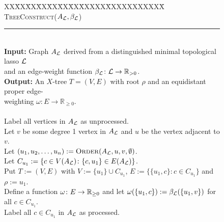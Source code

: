\begin{figure}
\centering
\parbox{0cm}{\begin{tabbing}
XX\= XX\= XX\=  XX\= XX\= XX\= XX\=  XXXXX\=  XXXXXXXXXXX\= \kill \\
{\textsc{TreeConstruct}($A_{{\mathcal L}},\beta_{{\mathcal L}}$)} \\
\rule{\columnwidth}{0.5pt}\\
\textbf{Input:} \> \> \> Graph $A_{{\mathcal L}}$ derived from a distinguished minimal topological lasso ${\mathcal L}$\\
                \> \> \> and an edge-weight function $\beta_{{\mathcal L}} \colon {\mathcal L} \to \mathbb{R}_{>0}$.\\
\textbf{Output:} \> \> \> An $X$-tree $T = (V,E)$ with root $\rho$ and an
                          equidistant proper edge-\\
                 \> \> \> weighting $\omega \colon E \to
                          \mathbb{R}_{\geq 0}$.\\\\

 \> Label all vertices in $A_{{\mathcal L}}$ as unprocessed.\\

 \> Let $v$ be some degree 1 vertex in $A_{{\mathcal L}}$ and $u$ be the vertex
           adjacent to $v$.\\

 \> Let $(u_1,u_2,\dotsc,u_n) := \text{\textsc{Order}}(A_{{\mathcal L}}, u, v, \emptyset)$.\\

 \> Let $C_{u_1} := \{c \in V(A_{{\mathcal L}}) \colon \{c,u_1\} \in E(A_{{\mathcal L}})\}$.\\
 \> Put $T:=(V,E)$ with $V := \{u_1\} \cup C_{u_1}$, $E := \{\{u_1,c\} \colon c \in C_{u_1}\}$
              and $ \rho := u_1$.\\
 \> Define a function $\omega \colon E \to {\mathbb R}_{\geq 0}$ and let
              $\omega(\{u_1,c\}) := \beta_{{\mathcal L}}(\{u_1,v\})$ for all $c \in C_{u_1}$.\\
 \> Label all $c \in C_{u_1}$ in $A_{{\mathcal L}}$ as processed.\\


\end{tabbing}}
\end{figure}
